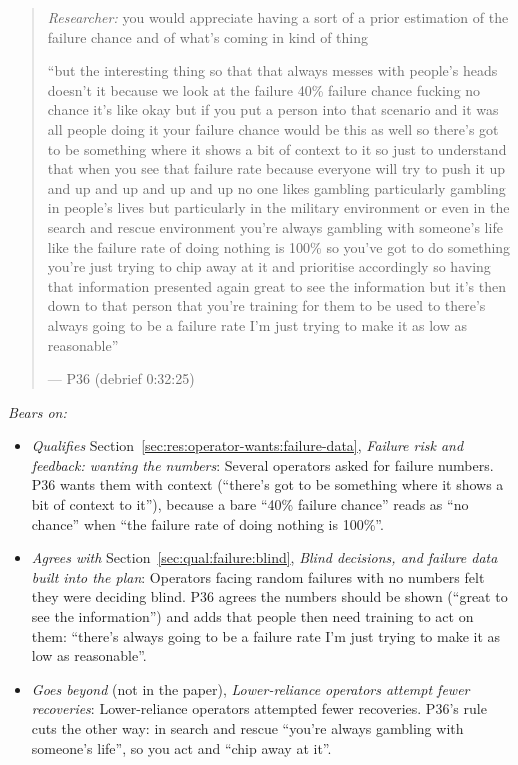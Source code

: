 \begin{quote}\small
{\footnotesize\textit{Researcher:} you would appreciate having a sort of a prior estimation of the failure chance and of what's coming in kind of thing}\par\smallskip
``but the interesting thing so that that always messes with people's heads doesn't it because we look at the failure 40\% failure chance fucking no chance it's like okay but if you put a person into that scenario and it was all people doing it your failure chance would be this as well so there's got to be something where it shows a bit of context to it so just to understand that when you see that failure rate because everyone will try to push it up and up and up and up and up no one likes gambling particularly gambling in people's lives but particularly in the military environment or even in the search and rescue environment you're always gambling with someone's life like the failure rate of doing nothing is 100\% so you've got to do something you're just trying to chip away at it and prioritise accordingly so having that information presented again great to see the information but it's then down to that person that you're training for them to be used to there's always going to be a failure rate I'm just trying to make it as low as reasonable''\par\hfill--- P36 (debrief 0:32:25)
\end{quote}

\noindent\textit{Bears on:}
\begin{itemize}[leftmargin=1.2em,itemsep=1pt]\small
\item \textit{Qualifies} Section~\ref{sec:res:operator-wants:failure-data}, \emph{Failure risk and feedback: wanting the numbers}: Several operators asked for failure numbers. P36 wants them with context (``there's got to be something where it shows a bit of context to it''), because a bare ``40\% failure chance'' reads as ``no chance'' when ``the failure rate of doing nothing is 100\%''.
\item \textit{Agrees with} Section~\ref{sec:qual:failure:blind}, \emph{Blind decisions, and failure data built into the plan}: Operators facing random failures with no numbers felt they were deciding blind. P36 agrees the numbers should be shown (``great to see the information'') and adds that people then need training to act on them: ``there's always going to be a failure rate I'm just trying to make it as low as reasonable''.
\item \textit{Goes beyond} (not in the paper), \emph{Lower-reliance operators attempt fewer recoveries}: Lower-reliance operators attempted fewer recoveries. P36's rule cuts the other way: in search and rescue ``you're always gambling with someone's life'', so you act and ``chip away at it''.
\end{itemize}

